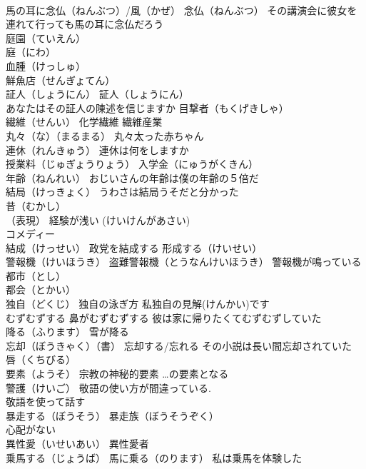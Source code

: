 \documentclass[8pt]{extreport}
\begin{document}
\begin{CJK}{UTF8}{min}
\\	馬の耳に念仏（ねんぶつ）/風（かぜ） 念仏（ねんぶつ） その講演会に彼女を連れて行っても馬の耳に念仏だろう
\\	庭園（ていえん）
\\	庭（にわ）
\\	血腫（けっしゅ） 
\\	鮮魚店（せんぎょてん）
\\	証人（しょうにん） 証人（しょうにん）
\\	あなたはその証人の陳述を信じますか 目撃者（もくげきしゃ）
\\	繊維（せんい） 化学繊維 繊維産業
\\	丸々（な）（まるまる） 丸々太った赤ちゃん
\\	連休（れんきゅう） 連休は何をしますか
\\	授業料（じゅぎょうりょう） 入学金（にゅうがくきん）
\\	年齢（ねんれい） おじいさんの年齢は僕の年齢の５倍だ
\\	結局（けっきょく） うわさは結局うそだと分かった
\\	昔（むかし）
\\	（表現）	経験が浅い (けいけんがあさい)
\\	コメディー
\\	結成（けっせい） 政党を結成する 形成する（けいせい）
\\	警報機（けいほうき） 盗難警報機（とうなんけいほうき） 警報機が鳴っている
\\	都市（とし）
\\	都会（とかい）
\\	独自（どくじ） 独自の泳ぎ方 私独自の見解(けんかい)です
\\	むずむずする 鼻がむずむずする 彼は家に帰りたくてむずむずしていた
\\	降る（ふります） 雪が降る
\\	忘却（ぼうきゃく）（書） 忘却する/忘れる その小説は長い間忘却されていた
\\	唇（くちびる）
\\	要素（ようそ） 宗教の神秘的要素 …の要素となる
\\	警護（けいご） 敬語の使い方が間違っている.　
\\	敬語を使って話す
\\	暴走する（ぼうそう） 暴走族（ぼうそうぞく）
\\	心配がない
\\	異性愛（いせいあい） 異性愛者
\\	乗馬する（じょうば） 馬に乗る（のります） 私は乗馬を体験した

\end{CJK}
\end{document}
